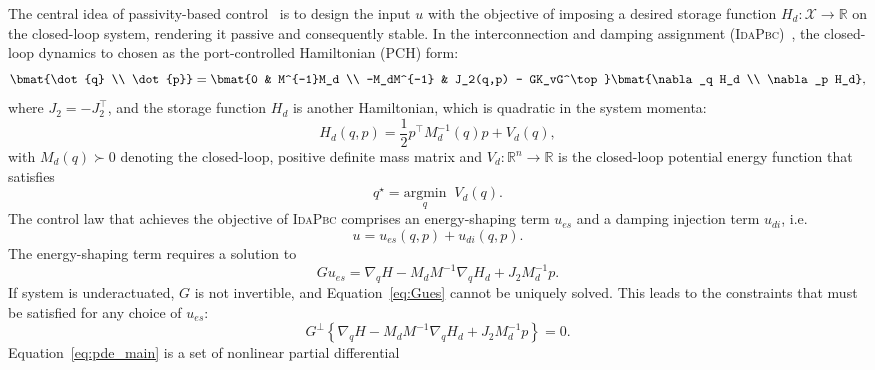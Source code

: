 The central idea of passivity-based control~\cite{van2000l2} is to design the
input $u$ with the objective of imposing a desired storage function $H_d:
\mathcal{X} \rightarrow \mathbb{R}$ on the closed-loop system, rendering it
passive and consequently stable.
%
In the interconnection and damping assignment
(\textsc{IdaPbc})~\cite{ortega2002stabilization}, the closed-loop dynamics to chosen as
the port-controlled Hamiltonian (PCH) form:
%
\begin{equation}
  \bmat{\dot{q} \\ \dot{p}}
  =
  \bmat{0 & M^{-1}M_d \\ -M_dM^{-1} & J_2(q,p) - GK_vG^\top}
  \bmat{\nabla_q H_d \\ \nabla_p H_d},
  \label{eq:pch}
\end{equation}
%
where $J_2 = -J_2^\top$, and the storage function $H_d$ is another Hamiltonian, which is quadratic in the
system momenta:
%
\begin{equation}
    H_d(q, p) = \frac{1}{2} p^\top M_d^{-1}(q) p + V_d(q),
    \label{eq:desired_hamiltonian}
\end{equation}
%
with $M_d(q) \succ 0$ denoting the closed-loop, positive definite mass matrix
and $V_d: \mathbb{R}^n \to \mathbb{R} $ is the closed-loop potential energy
function that satisfies
%
\begin{equation}
  q^\star = \underset{q}{\textrm{argmin}} \; \; V_d(q).
  \label{eq:argmin_Vd}
\end{equation}
%
The control law that achieves the objective of \textsc{IdaPbc} comprises an
energy-shaping term $u_{es}$ and a damping injection term $u_{di}$, i.e.
%
\begin{equation}
    u = u_{es}(q,p) + u_{di}(q,p).
    \label{eq:ida-pbc_control}
\end{equation}
%
The energy-shaping term requires a solution to
%
\begin{equation}
    Gu_{es} = \nabla_qH - M_dM^{-1} \nabla_qH_d + J_2M_d^{-1}p.
    \label{eq:Gues}
\end{equation}
%
If system is underactuated, $G$ is not invertible, and Equation~\eqref{eq:Gues}
cannot be uniquely solved. This leads to the constraints that must be satisfied
for any choice of $u_{es}$:
%
\begin{equation}
  G^\perp \left\{ \nabla_qH - M_dM^{-1} \nabla_qH_d + J_2M_d^{-1}p \right\} = 0.
  \label{eq:pde_main}
\end{equation}
%
Equation~\eqref{eq:pde_main} is a set of nonlinear partial differential
